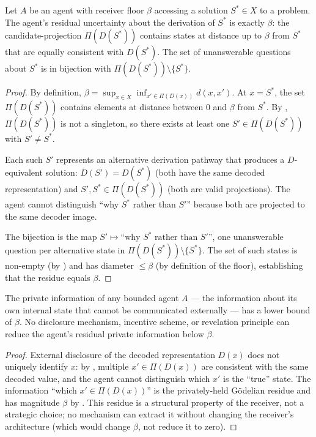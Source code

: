 \documentclass[twocolumn,11pt,a4paper]{article}
\begin{document}
\begin{theorem}
\label{thm:godelresiduefloor}
Let $A$ be an agent with receiver floor $\beta$ accessing a solution
$S^*\in X$ to a problem.  The agent's residual uncertainty about the
derivation of $S^*$ is exactly $\beta$: the candidate-projection
$\Pi(D(S^*))$ contains states at distance up to $\beta$ from $S^*$ that
are equally consistent with $D(S^*)$.  The set of unanswerable questions
about $S^*$ is in bijection with $\Pi(D(S^*))\setminus\{S^*\}$.
\end{theorem}

\begin{proof}
By definition,
$\beta=\sup_{x\in X}\inf_{x'\in\Pi(D(x))}d(x,x')$.
At $x=S^*$, the set $\Pi(D(S^*))$ contains elements at distance between
$0$ and $\beta$ from $S^*$.  By , $\Pi(D(S^*))$
is not a singleton, so there exists at least one $S'\in\Pi(D(S^*))$ with
$S'\neq S^*$.

Each such $S'$ represents an alternative derivation pathway that produces
a $D$-equivalent solution: $D(S')=D(S^*)$ (both have the same decoded
representation) and $S',S^*\in\Pi(D(S^*))$ (both are valid projections).
The agent cannot distinguish ``why $S^*$ rather than $S'$'' because both
are projected to the same decoder image.

The bijection is the map $S'\mapsto\text{``why $S^*$ rather than $S'$''}$,
one unanswerable question per alternative state in
$\Pi(D(S^*))\setminus\{S^*\}$.  The set of such states is non-empty
(by ) and has diameter $\leq\beta$ (by
definition of the floor), establishing that the residue equals $\beta$.
\end{proof}

\begin{corollary}
\label{cor:privateirred}
The private information of any bounded agent $A$ — the information about
its own internal state that cannot be communicated externally — has a
lower bound of $\beta$.  No disclosure mechanism, incentive scheme, or
revelation principle can reduce the agent's residual private information
below $\beta$.
\end{corollary}

\begin{proof}
External disclosure of the decoded representation $D(x)$ does not
uniquely identify $x$: by , multiple
$x'\in\Pi(D(x))$ are consistent with the same decoded value, and the
agent cannot distinguish which $x'$ is the ``true'' state.  The
information ``which $x'\in\Pi(D(x))$'' is the privately-held G\"odelian
residue and has magnitude $\beta$ by .
This residue is a structural property of the receiver, not a strategic
choice; no mechanism can extract it without changing the receiver's
architecture (which would change $\beta$, not reduce it to zero).
\end{proof}
\end{document}
